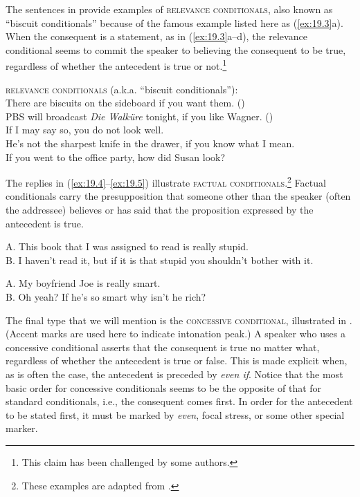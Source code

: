 The sentences in  provide examples of \textsc{relevance} \textsc{conditionals}, also known as “biscuit conditionals” because of the famous example listed here as (\ref{ex:19.3}a). When the consequent is a statement, as in (\ref{ex:19.3}a--d), the relevance conditional seems to commit the speaker to believing the consequent to be true, regardless of whether the antecedent is true or not.\footnote{This claim has been challenged by some authors.}


\ea \label{ex:19.3}
\textsc{relevance} \textsc{conditionals} (a.k.a. “biscuit conditionals”):\\
\ea  There are biscuits on the sideboard if you want them.  (\citealt{Austin1956})\\
\ex PBS will broadcast \textit{Die Walküre} tonight, if you like Wagner.  (\citealt{Bennett2003})\\
\ex If I may say so, you do not look well.\\
\ex He’s not the sharpest knife in the drawer, if you know what I mean.\\
\ex If you went to the office party, how did Susan look?
                       \z
\z


The replies in (\ref{ex:19.4}--\ref{ex:19.5}) illustrate \textsc{factual} \textsc{conditionals}.\footnote{These examples are adapted from   \citet[671]{BhattPancheva2006}.} Factual conditionals carry the presupposition that someone other than the speaker (often the addressee) believes or has said that the proposition expressed by the antecedent is true.


\ea \label{ex:19.4}
A. This book that I was assigned to read is really stupid.\\
B. I haven’t read it, but if it is that stupid you shouldn’t bother with it.
\z

\ea \label{ex:19.5}
A. My boyfriend Joe is really smart.\\
B. Oh yeah? If he’s so smart why isn’t he rich?
\z


The final type that we will mention is the \textsc{concessive conditional}, illustrated in . (Accent marks are used here to indicate intonation peak.) A speaker who uses a concessive conditional asserts that the consequent is true no matter what, regardless of whether the antecedent is true or false. This is made explicit when, as is often the case, the antecedent is preceded by \textit{even if}. Notice that the most basic order for concessive conditionals seems to be the opposite of that for standard conditionals, i.e., the consequent comes first. In order for the antecedent to be stated first, it must be marked by \textit{even}, focal stress, or some other special marker.


